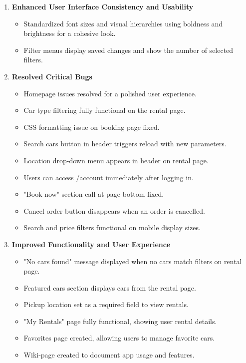 \documentclass[a4paper,12pt]{article}
\begin{document}
\begin{enumerate}
    \item \textbf{Enhanced User Interface Consistency and Usability}
    \begin{itemize}
        \item Standardized font sizes and visual hierarchies using boldness and brightness for a cohesive look.
        \item Filter menus display saved changes and show the number of selected filters.
    \end{itemize}
    \item \textbf{Resolved Critical Bugs}
    \begin{itemize}
        \item Homepage issues resolved for a polished user experience.
        \item Car type filtering fully functional on the rental page.
        \item CSS formatting issue on booking page fixed.
        \item Search cars button in header triggers reload with new parameters.
        \item Location drop-down menu appears in header on rental page.
        \item Users can access /account immediately after logging in.
        \item "Book now" section call at page bottom fixed.
        \item Cancel order button disappears when an order is cancelled.
        \item Search and price filters functional on mobile display sizes.
    \end{itemize}
    \item \textbf{Improved Functionality and User Experience}
    \begin{itemize}
        \item "No cars found" message displayed when no cars match filters on rental page.
        \item Featured cars section displays cars from the rental page.
        \item Pickup location set as a required field to view rentals.
        \item "My Rentals" page fully functional, showing user rental details.
        \item Favorites page created, allowing users to manage favorite cars.
        \item Wiki-page created to document app usage and features.

\end{itemize}
\end{enumerate}
\end{document}

